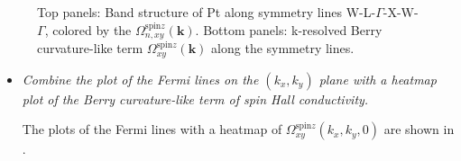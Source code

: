 \begin{figure}[htb!]
\centering
{}\qquad
{}
\caption{Top panels: Band structure of Pt along symmetry lines W-L-$\Gamma$-X-W-$\Gamma$, colored by
the $\Omega_{n,xy}^{\text{spin}z}({\bm k})$. 
Bottom panels: k-resolved Berry curvature-like term $\Omega_{xy}^{\text{spin}z}(\bm k)$ along the symmetry lines.}
\label{fig29.1}
\end{figure}
\clearpage

\begin{itemize}
	\item {\it Combine the plot of the Fermi lines on the $(k_x,k_y)$ plane with a heatmap plot of the Berry curvature-like term of spin Hall conductivity.}

	The plots of the Fermi lines with a heatmap of $\Omega_{xy}^{\text{spin}z}(k_x,k_y,0)$ are shown in .
\end{itemize}

